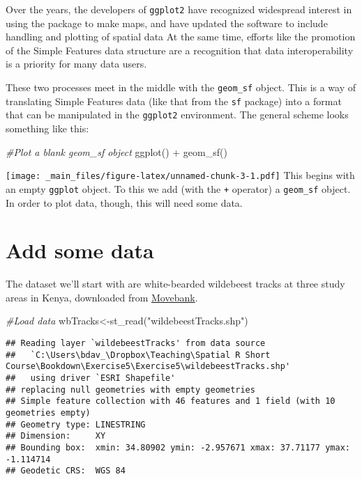 \documentclass[
]{book}
\newenvironment{Shaded}{\begin{snugshade}}{\end{snugshade}}
\newcommand{\CommentTok}[1]{\textcolor[rgb]{0.56,0.35,0.01}{\textit{#1}}}
\newcommand{\FunctionTok}[1]{\textcolor[rgb]{0.00,0.00,0.00}{#1}}
\newcommand{\NormalTok}[1]{#1}
\newcommand{\OtherTok}[1]{\textcolor[rgb]{0.56,0.35,0.01}{#1}}
\newcommand{\SpecialCharTok}[1]{\textcolor[rgb]{0.00,0.00,0.00}{#1}}
\newcommand{\StringTok}[1]{\textcolor[rgb]{0.31,0.60,0.02}{#1}}
\begin{document}
Over the years, the developers of \texttt{ggplot2} have recognized widespread interest in using the package to make maps, and have updated the software to include handling and plotting of spatial data At the same time, efforts like the promotion of the Simple Features data structure are a recognition that data interoperability is a priority for many data users.

These two processes meet in the middle with the \texttt{geom\_sf} object. This is a way of translating Simple Features data (like that from the \texttt{sf} package) into a format that can be manipulated in the \texttt{ggplot2} environment. The general scheme looks something like this:

\begin{Shaded}
\begin{Highlighting}[]
\CommentTok{\#Plot a blank geom\_sf object}
\FunctionTok{ggplot}\NormalTok{() }\SpecialCharTok{+} \FunctionTok{geom\_sf}\NormalTok{()}
\end{Highlighting}
\end{Shaded}

\texttt{[image: \_main\_files/figure-latex/unnamed-chunk-3-1.pdf]}
This begins with an empty \texttt{ggplot} object. To this we add (with the \texttt{+} operator) a \texttt{geom\_sf} object. In order to plot data, though, this will need some data.

\hypertarget{add-some-data}{%
\section{Add some data}\label{add-some-data}}

The dataset we'll start with are white-bearded wildebeest tracks at three study areas in Kenya, downloaded from \href{https://www.movebank.org/cms/webapp?gwt_fragment=page=studies,path=study208413731}{Movebank}.

\begin{Shaded}
\begin{Highlighting}[]
\CommentTok{\#Load data}
\NormalTok{wbTracks}\OtherTok{\textless{}{-}}\FunctionTok{st\_read}\NormalTok{(}\StringTok{"wildebeestTracks.shp"}\NormalTok{)}
\end{Highlighting}
\end{Shaded}

\begin{verbatim}
## Reading layer `wildebeestTracks' from data source 
##   `C:\Users\bdav_\Dropbox\Teaching\Spatial R Short Course\Bookdown\Exercise5\Exercise5\wildebeestTracks.shp' 
##   using driver `ESRI Shapefile'
## replacing null geometries with empty geometries
## Simple feature collection with 46 features and 1 field (with 10 geometries empty)
## Geometry type: LINESTRING
## Dimension:     XY
## Bounding box:  xmin: 34.80902 ymin: -2.957671 xmax: 37.71177 ymax: -1.114714
## Geodetic CRS:  WGS 84
\end{verbatim}
\end{document}
